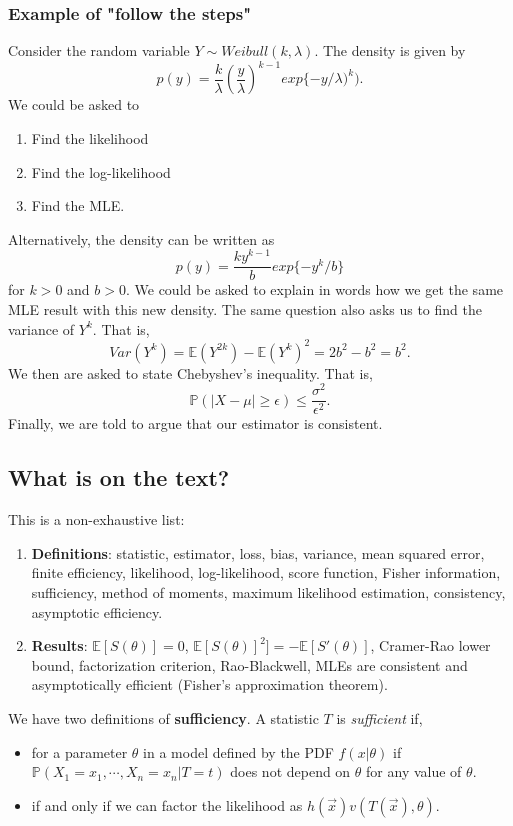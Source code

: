 \documentclass[titlepage, 12pt, leqno]{article}
\begin{document}
\subsubsection{Example of "follow the steps"}
Consider the random variable $Y \sim Weibull(k, \lambda)$. The density is given
by
\[
p(y) = \frac{k}{\lambda}\left(\frac{y}{\lambda}\right)^{k-1}exp\{-y/\lambda)^{k}).
\]
We could be asked to
\begin{enumerate}
    \item Find the likelihood
    \item Find the log-likelihood
    \item Find the MLE.
\end{enumerate}
Alternatively, the density can be written as 
\[
    p(y) = \frac{ky^{k-1}}{b}exp\{-y^{k}/b\}
\]
for $k>0$ and $b>0$. We could be asked to explain in words how we get the 
same MLE result with this new density. The same question also asks us to find
the variance of $Y^{k}$. That is,
\[
Var(Y^{k}) = \mathbb{E}(Y^{2k}) - \mathbb{E}(Y^{k})^{2} = 2b^{2}-b^{2} = b^{2}.
\]
We then are asked to state Chebyshev's inequality. That is,
\[
\mathbb{P}(|X-\mu| \ge \epsilon) \le \frac{\sigma^{2}}{\epsilon^{2}}.
\]
Finally, we are told to argue that our estimator is consistent.

\subsection{What is on the text?}
This is a non-exhaustive list:
\begin{enumerate}
    \item \textbf{Definitions}: statistic, estimator, loss, bias, variance,
        mean squared error, finite efficiency, likelihood, log-likelihood,
        score function, Fisher information, sufficiency, method of moments,
        maximum likelihood estimation, consistency, asymptotic efficiency.
    \item \textbf{Results}: $\mathbb{E}[S(\theta)] = 0$, $\mathbb{E}[S(\theta)]
        ^{2}] = - \mathbb{E}[S'(\theta)]$, Cramer-Rao lower bound, factorization
        criterion, Rao-Blackwell, MLEs are consistent and asymptotically
        efficient (Fisher's approximation theorem).
\end{enumerate}

\begin{definition}
    We have two definitions of \textbf{sufficiency}. A statistic $T$ is
    \textit{sufficient} if,
    \begin{itemize}
        \item for a parameter $\theta$ in a model defined by the PDF
            $f(x|\theta)$ if $\mathbb{P}(X_{1}=x_{1}, \cdots ,X_{n}=x_{n}|
            T=t)$ does not depend on $\theta$ for any value of $\theta$.
        \item if and only if we can factor the likelihood as
            $h(\vec x)v(T(\vec x),\theta)$.
    \end{itemize}
\end{definition}
\end{document}
